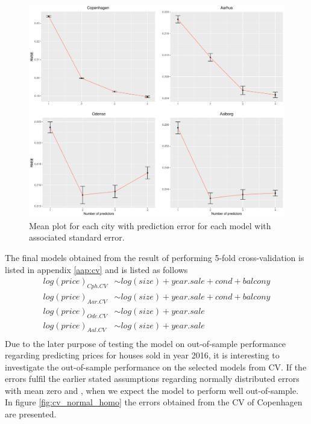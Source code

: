 \begin{figure}[H]
    \centering
  \includegraphics[width = 1 \textwidth]{figures/Nanna/CrossValidationSamlet.pdf}
  \caption{Mean plot for each city with prediction error for each model with associated standard error.}
  \label{fig:CrossValidationSamlet}
\end{figure}

The final models obtained from the result of performing 5-fold cross-validation is listed in appendix \ref{aap:cv} and is listed as follows
\begin{align*}
    log(price)_{Cph.CV} &\sim log(size) + year.sale + cond + balcony \\
    log(price)_{Aar.CV} &\sim log(size) + year.sale + cond + balcony\\
    log(price)_{Ode.CV} &\sim log(size) + year.sale \\
    log(price)_{Aal.CV} &\sim log(size) + year.sale \\
\end{align*}
Due to the later purpose of testing the model on out-of-sample performance regarding predicting prices for houses sold in year 2016, it is interesting to investigate the out-of-sample performance on the selected models from CV.
If the errors fulfil the earlier stated assumptions regarding normally distributed errors with mean zero and \homo, when we expect the model to perform well out-of-sample. In figure \ref{fig:cv_normal_homo} the errors obtained from the CV of Copenhagen are presented.

